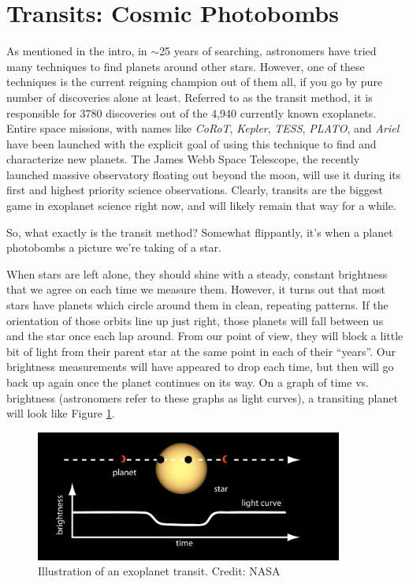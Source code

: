 \documentclass[11pt]{article}
\begin{document}
\section{Transits: Cosmic Photobombs}

As mentioned in the intro, in $\sim$25 years of searching, astronomers have tried many techniques to find planets around other stars. However, one of these techniques is the current reigning champion out of them all, if you go by pure number of discoveries alone at least. Referred to as the transit method, it is responsible for 3780 discoveries out of the 4,940 currently known exoplanets. Entire space missions, with names like \textit{CoRoT}, \textit{Kepler}, \textit{TESS}, \textit{PLATO}, and \textit{Ariel} have been launched with the explicit goal of using this technique to find and characterize new planets. The James Webb Space Telescope, the recently launched massive observatory floating out beyond the moon, will use it during its first and highest priority science observations. Clearly, transits are the biggest game in exoplanet science right now, and will likely remain that way for a while.

\medskip \noindent
So, what exactly is the transit method? Somewhat flippantly, it’s when a planet photobombs a picture we’re taking of a star.

\medskip \noindent
When stars are left alone, they should shine with a steady, constant brightness that we agree on each time we measure them. However, it turns out that most stars have planets which circle around them in clean, repeating patterns. If the orientation of those orbits line up just right, those planets will fall between us and the star once each lap around. From our point of view, they will block a little bit of light from their parent star at the same point in each of their “years”. Our brightness measurements will have appeared to drop each time, but then will go back up again once the planet continues on its way. On a graph of time vs. brightness (astronomers refer to these graphs as light curves), a transiting planet will look like Figure \ref{fig:transit}.

\begin{figure}[h!]
    \centering
    \includegraphics[width=0.9\textwidth]{Images/transit_cartoon.png}
    \caption{Illustration of an exoplanet transit. Credit: NASA}
    \label{fig:transit}
\end{figure}
\end{document}
